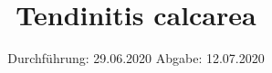 

\subject{TPS Praktikum}
\title{Tendinitis calcarea}
\date{%
  Durchführung: 29.06.2020
  \hspace{3em}
  Abgabe: 12.07.2020
}



\maketitle
\thispagestyle{empty}
\tableofcontents
\newpage






\printbibliography{}
\nocite{*}


